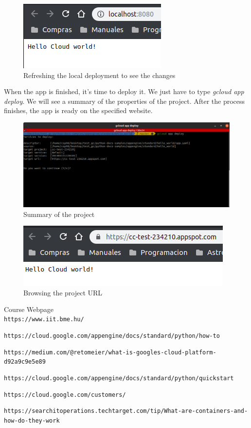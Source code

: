 \documentclass[12pt,english]{article}
\begin{document}
\begin{figure}[H]
  \centering
  \includegraphics[scale = 1]{../img/tutorial/7browsemodify}
  \caption{Refreshing the local deployment to see the changes}
\end{figure}

When the app is finished, it's time to deploy it. We just have to type \emph{gcloud app deploy}. We will see a summary of the properties of the project. After the process finishes, the app is ready on the specified website.

\begin{figure}[H]
  \centering
  \includegraphics[scale = 0.5]{../img/tutorial/8deploy}
  \caption{Summary of the project}
\end{figure}

\begin{figure}[H]
  \centering
  \includegraphics[scale = 1]{../img/tutorial/9browse}
  \caption{Browsing the project URL}
\end{figure}

\newpage

\begin{thebibliography}{9}

Course Webpage
\\\texttt{https://www.iit.bme.hu/}

 \texttt{https://cloud.google.com/appengine/docs/standard/python/how-to}

 \texttt{https://medium.com/@retomeier/what-is-googles-cloud-platform-d92a9c9e5e89}

 \texttt{https://cloud.google.com/appengine/docs/standard/python/quickstart}

\texttt{https://cloud.google.com/customers/}

\texttt{https://searchitoperations.techtarget.com/tip/What-are-containers-and-how-do-they-work}


\end{thebibliography}
\end{document}
